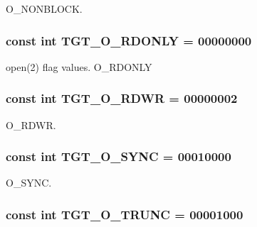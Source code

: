 O\_\-NONBLOCK. \hypertarget{classArmLinux32_ad266b23a0ae07d1833e18bae651f3411}{
\subsubsection[{TGT\_\-O\_\-RDONLY}]{\setlength{\rightskip}{0pt plus 5cm}const int {\bf TGT\_\-O\_\-RDONLY} = 00000000}}
\label{classArmLinux32_ad266b23a0ae07d1833e18bae651f3411}


open(2) flag values. O\_\-RDONLY \hypertarget{classArmLinux32_ac6fa9ecf5d2f3314f197698f1099e2ac}{
\subsubsection[{TGT\_\-O\_\-RDWR}]{\setlength{\rightskip}{0pt plus 5cm}const int {\bf TGT\_\-O\_\-RDWR} = 00000002}}
\label{classArmLinux32_ac6fa9ecf5d2f3314f197698f1099e2ac}


O\_\-RDWR. \hypertarget{classArmLinux32_abf43ab05d2a5b6b8113952160d8565db}{
\subsubsection[{TGT\_\-O\_\-SYNC}]{\setlength{\rightskip}{0pt plus 5cm}const int {\bf TGT\_\-O\_\-SYNC} = 00010000}}
\label{classArmLinux32_abf43ab05d2a5b6b8113952160d8565db}


O\_\-SYNC. \hypertarget{classArmLinux32_a4f892ee6e1424a2becd859b0bef1f18b}{
\subsubsection[{TGT\_\-O\_\-TRUNC}]{\setlength{\rightskip}{0pt plus 5cm}const int {\bf TGT\_\-O\_\-TRUNC} = 00001000}}
\label{classArmLinux32_a4f892ee6e1424a2becd859b0bef1f18b}


